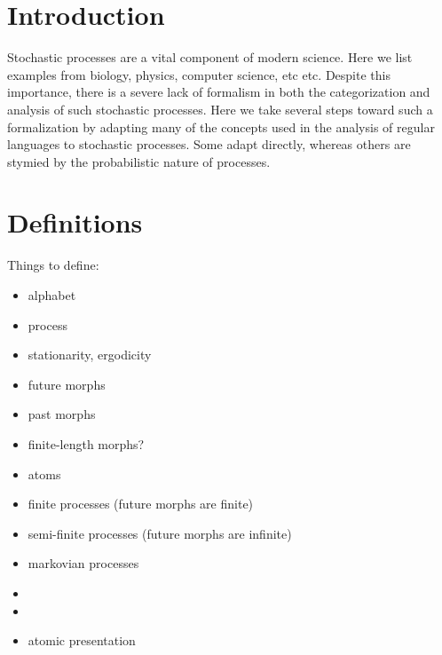 \documentclass[prl,twocolumn,showpacs,superscriptaddress,preprintnumbers,floatfix]{revtex4-1}
\theoremstyle{plain}    \newtheorem{Lem}{Lemma}
\theoremstyle{plain}    \newtheorem*{ProLem}{Proof}
\theoremstyle{plain}    \newtheorem{Cor}{Corollary}
\theoremstyle{plain}    \newtheorem*{ProCor}{Proof}
\theoremstyle{plain}    \newtheorem{The}{Theorem}
\theoremstyle{plain}    \newtheorem*{ProThe}{Proof}
\theoremstyle{plain}    \newtheorem{Prop}{Proposition}
\theoremstyle{plain}    \newtheorem*{ProProp}{Proof}
\theoremstyle{plain}    \newtheorem*{Conj}{Conjecture}
\theoremstyle{plain}    \newtheorem*{Rem}{Remark}
\theoremstyle{plain}    \newtheorem{Def}{Definition}
\theoremstyle{plain}    \newtheorem*{Not}{Notation}
\begin{document}



\section{Introduction}
\label{sec:introduction}

Stochastic processes are a vital component of modern science. Here we list
examples from biology, physics, computer science, etc etc. Despite this
importance, there is a severe lack of formalism in both the categorization and
analysis of such stochastic processes. Here we take several steps toward such a
formalization by adapting many of the concepts used in the analysis of regular
languages to stochastic processes. Some adapt directly, whereas others are
stymied by the probabilistic nature of processes.

\section{Definitions}
\label{sec:definitions}

Things to define:
\begin{itemize}
  \item alphabet
  \item process
  \item stationarity, ergodicity
  \item future morphs
  \item past morphs
  \item finite-length morphs?
  \item atoms
  \item finite processes (future morphs are finite)
  \item semi-finite processes (future morphs are infinite)
  \item markovian processes
  \item \eM
  \item \eT
  \item atomic presentation
\end{itemize}
\end{document}

